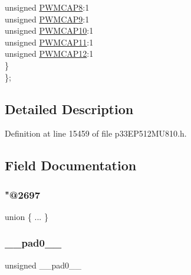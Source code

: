 \begin{DoxyCompactItemize}
\begin{tabbing}
\>\>unsigned \hyperlink{structtag_p_w_m_c_a_p6_b_i_t_s_a01b802d233dbea59cd23996d219e39c9}{PWMCAP8}:1\\
\>\>unsigned \hyperlink{structtag_p_w_m_c_a_p6_b_i_t_s_a9a0cd5d7a58681927adecfd9946b75fb}{PWMCAP9}:1\\
\>\>unsigned \hyperlink{structtag_p_w_m_c_a_p6_b_i_t_s_a765ff5b5b1008d8aeb0359590759bd42}{PWMCAP10}:1\\
\>\>unsigned \hyperlink{structtag_p_w_m_c_a_p6_b_i_t_s_a50c60306a98023b9bb8fac50c8d5e965}{PWMCAP11}:1\\
\>\>unsigned \hyperlink{structtag_p_w_m_c_a_p6_b_i_t_s_a8fec92523cf22c89f156a97aca44dcff}{PWMCAP12}:1\\
\>\} \\
\}; \\

\end{tabbing}\end{DoxyCompactItemize}


\subsection{Detailed Description}


Definition at line 15459 of file p33\+E\+P512\+M\+U810.\+h.



\subsection{Field Documentation}
\mbox{\label{structtag_p_w_m_c_a_p6_b_i_t_s_ac8dcf7c97b0d1588bae741d4098cde5a}} 
\subsubsection{\texorpdfstring{"@2697}{@2697}}
{\footnotesize\ttfamily union \{ ... \} }

\mbox{\label{structtag_p_w_m_c_a_p6_b_i_t_s_adf71f3d8410c1f1dbbc96680a92c49af}} 
\subsubsection{\texorpdfstring{\+\_\+\+\_\+pad0\+\_\+\+\_\+}{\_\_pad0\_\_}}
{\footnotesize\ttfamily unsigned \+\_\+\+\_\+pad0\+\_\+\+\_\+}




